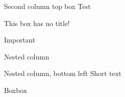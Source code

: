 \documentclass[a3,2col]{ostposter}
\begin{document}
\begin{postercolumn}[0.7]
	\begin{posterbox}[postergreen]{Second column top box}
		Test
	\end{posterbox}
	\begin{posterbox}{}
		This box has no title!
	\end{posterbox}
	\begin{posterbox}[posterpurple]{Important}
		\lipsum[3]
	\end{posterbox}
	\begin{posterarea}[2][][0.6]
		\begin{postercolumn}[0.4]
			\begin{posterbox}[posterblue]{Nested column}
				\lipsum[4-5]
			\end{posterbox}
			\begin{posterbox}[posterorange]{}
			\end{posterbox}
			\begin{posterbox}[posteryellow]{Nested column, bottom left}
				Short text
			\end{posterbox}
		\end{postercolumn}
		\begin{postercolumn}[0.6]
			\begin{posterbox}[postergreen]{Boxbox}
				\lipsum[5]
			\end{posterbox}

\end{postercolumn}
\end{posterarea}
\end{postercolumn}
\end{document}
